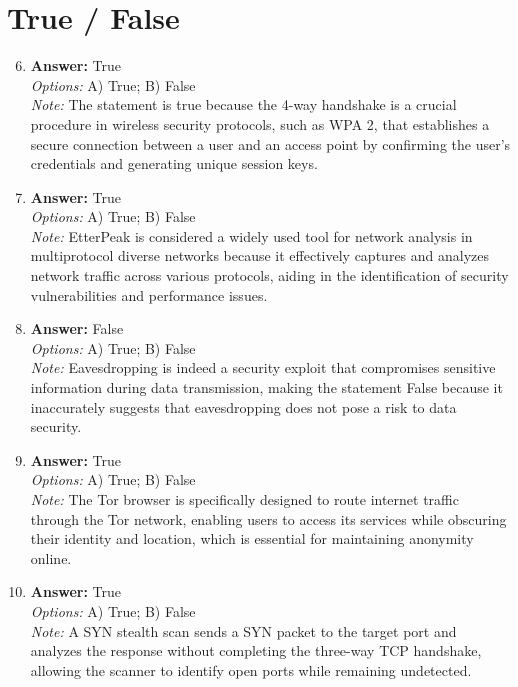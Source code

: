 \documentclass[12pt]{article}
\begin{document}
\section*{True / False}
\begin{enumerate}[label=\arabic*.]
\setcounter{enumi}{5}
\item \textbf{Answer:} True
\\ \textit{Options:} A) True; B) False
\\ \textit{Note:} The statement is true because the 4-way handshake is a crucial procedure in wireless security protocols, such as WPA 2, that establishes a secure connection between a user and an access point by confirming the user's credentials and generating unique session keys.
\item \textbf{Answer:} True
\\ \textit{Options:} A) True; B) False
\\ \textit{Note:} EtterPeak is considered a widely used tool for network analysis in multiprotocol diverse networks because it effectively captures and analyzes network traffic across various protocols, aiding in the identification of security vulnerabilities and performance issues.
\item \textbf{Answer:} False
\\ \textit{Options:} A) True; B) False
\\ \textit{Note:} Eavesdropping is indeed a security exploit that compromises sensitive information during data transmission, making the statement False because it inaccurately suggests that eavesdropping does not pose a risk to data security.
\item \textbf{Answer:} True
\\ \textit{Options:} A) True; B) False
\\ \textit{Note:} The Tor browser is specifically designed to route internet traffic through the Tor network, enabling users to access its services while obscuring their identity and location, which is essential for maintaining anonymity online.
\item \textbf{Answer:} True
\\ \textit{Options:} A) True; B) False
\\ \textit{Note:} A SYN stealth scan sends a SYN packet to the target port and analyzes the response without completing the three-way TCP handshake, allowing the scanner to identify open ports while remaining undetected.
\end{enumerate}
\end{document}
